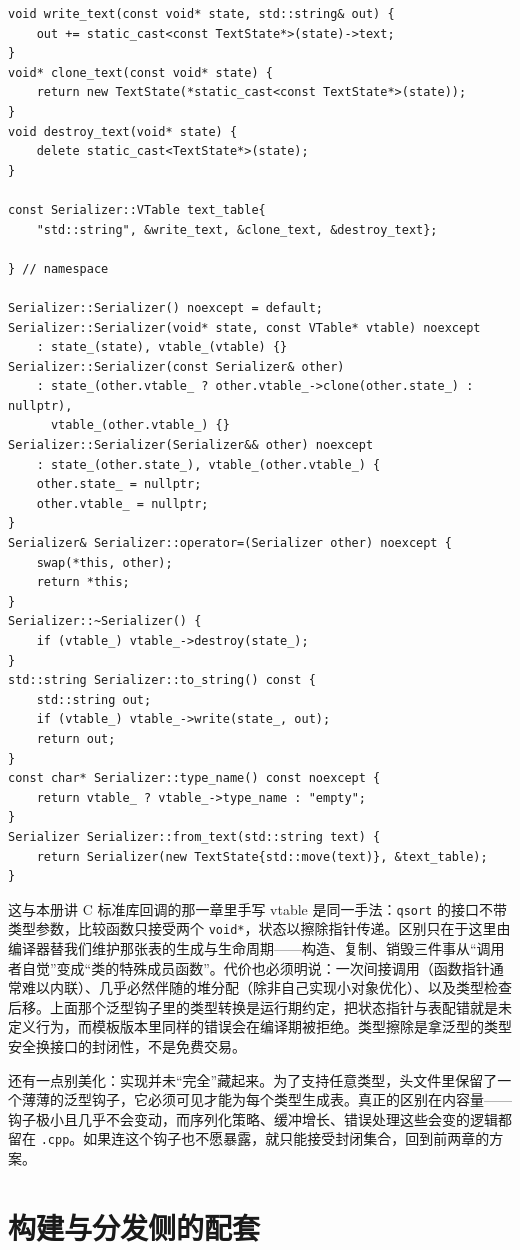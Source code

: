 \documentclass[12pt,a4paper,fontset=fandol]{ctexbook}
\newcommand{\kw}[1]{\texttt{#1}}
\begin{document}
\begin{lstlisting}[style=cppstyle,caption={手写函数指针表加擦除状态指针的类型擦除示例}]
void write_text(const void* state, std::string& out) {
    out += static_cast<const TextState*>(state)->text;
}
void* clone_text(const void* state) {
    return new TextState(*static_cast<const TextState*>(state));
}
void destroy_text(void* state) {
    delete static_cast<TextState*>(state);
}

const Serializer::VTable text_table{
    "std::string", &write_text, &clone_text, &destroy_text};

} // namespace

Serializer::Serializer() noexcept = default;
Serializer::Serializer(void* state, const VTable* vtable) noexcept
    : state_(state), vtable_(vtable) {}
Serializer::Serializer(const Serializer& other)
    : state_(other.vtable_ ? other.vtable_->clone(other.state_) : nullptr),
      vtable_(other.vtable_) {}
Serializer::Serializer(Serializer&& other) noexcept
    : state_(other.state_), vtable_(other.vtable_) {
    other.state_ = nullptr;
    other.vtable_ = nullptr;
}
Serializer& Serializer::operator=(Serializer other) noexcept {
    swap(*this, other);
    return *this;
}
Serializer::~Serializer() {
    if (vtable_) vtable_->destroy(state_);
}
std::string Serializer::to_string() const {
    std::string out;
    if (vtable_) vtable_->write(state_, out);
    return out;
}
const char* Serializer::type_name() const noexcept {
    return vtable_ ? vtable_->type_name : "empty";
}
Serializer Serializer::from_text(std::string text) {
    return Serializer(new TextState{std::move(text)}, &text_table);
}
\end{lstlisting}

这与本册讲 C 标准库回调的那一章里手写 vtable 是同一手法：\kw{qsort} 的接口不带类型参数，比较函数只接受两个 \kw{void*}，状态以擦除指针传递。区别只在于这里由编译器替我们维护那张表的生成与生命周期——构造、复制、销毁三件事从“调用者自觉”变成“类的特殊成员函数”。代价也必须明说：一次间接调用（函数指针通常难以内联）、几乎必然伴随的堆分配（除非自己实现小对象优化）、以及类型检查后移。上面那个泛型钩子里的类型转换是运行期约定，把状态指针与表配错就是未定义行为，而模板版本里同样的错误会在编译期被拒绝。类型擦除是拿泛型的类型安全换接口的封闭性，不是免费交易。

还有一点别美化：实现并未“完全”藏起来。为了支持任意类型，头文件里保留了一个薄薄的泛型钩子，它必须可见才能为每个类型生成表。真正的区别在内容量——钩子极小且几乎不会变动，而序列化策略、缓冲增长、错误处理这些会变的逻辑都留在 \kw{.cpp}。如果连这个钩子也不愿暴露，就只能接受封闭集合，回到前两章的方案。

\section{构建与分发侧的配套}
\end{document}
